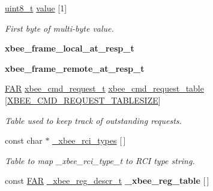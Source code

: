 \begin{DoxyCompactItemize}
\item 
\hyperlink{group__hal_gae1affc9ca37cfb624959c866a73f83c2}{uint8\-\_\-t} \hyperlink{group__xbee__atcmd_ga5bf2410fa8ec37f47f8afeba8dcc7f1b}{value} \mbox{[}1\mbox{]}
\begin{DoxyCompactList}\small\item\em First byte of multi-\/byte value. \end{DoxyCompactList}\item 
\hypertarget{group__xbee__atcmd_gab63b15c8139a653c95998e4c1bcd2b99}{{\bfseries xbee\-\_\-frame\-\_\-local\-\_\-at\-\_\-resp\-\_\-t}}\label{group__xbee__atcmd_gab63b15c8139a653c95998e4c1bcd2b99}

\item 
\hypertarget{group__xbee__atcmd_ga4c2b2ae22bdb77d9f8427b9bfff5a35d}{{\bfseries xbee\-\_\-frame\-\_\-remote\-\_\-at\-\_\-resp\-\_\-t}}\label{group__xbee__atcmd_ga4c2b2ae22bdb77d9f8427b9bfff5a35d}

\item 
\hypertarget{group__xbee__atcmd_ga551531248de3d539dfb15bd89cf4734b}{\hyperlink{group__hal_gaef060b3456fdcc093a7210a762d5f2ed}{F\-A\-R} \hyperlink{structxbee__cmd__request__t}{xbee\-\_\-cmd\-\_\-request\-\_\-t} \hyperlink{group__xbee__atcmd_ga551531248de3d539dfb15bd89cf4734b}{xbee\-\_\-cmd\-\_\-request\-\_\-table} \mbox{[}\hyperlink{group__xbee__atcmd_gaf992e9b985e2b1eb185ef3d2d38a01c0}{X\-B\-E\-E\-\_\-\-C\-M\-D\-\_\-\-R\-E\-Q\-U\-E\-S\-T\-\_\-\-T\-A\-B\-L\-E\-S\-I\-Z\-E}\mbox{]}}\label{group__xbee__atcmd_ga551531248de3d539dfb15bd89cf4734b}

\begin{DoxyCompactList}\small\item\em Table used to keep track of outstanding requests. \end{DoxyCompactList}\item 
\hypertarget{group__xbee__atcmd_ga62238d483c628f8c996664ff0f47ccef}{const char $\ast$ \hyperlink{group__xbee__atcmd_ga62238d483c628f8c996664ff0f47ccef}{\-\_\-xbee\-\_\-rci\-\_\-types} \mbox{[}$\,$\mbox{]}}\label{group__xbee__atcmd_ga62238d483c628f8c996664ff0f47ccef}

\begin{DoxyCompactList}\small\item\em Table to map \-\_\-xbee\-\_\-rci\-\_\-type\-\_\-t to R\-C\-I type string. \end{DoxyCompactList}\item 
\hypertarget{group__xbee__atcmd_ga38e53826af221faaa9c92525dfeb8ed3}{const \hyperlink{group__hal_gaef060b3456fdcc093a7210a762d5f2ed}{F\-A\-R} \hyperlink{struct__xbee__reg__descr__t}{\-\_\-xbee\-\_\-reg\-\_\-descr\-\_\-t} {\bfseries \-\_\-xbee\-\_\-reg\-\_\-table} \mbox{[}$\,$\mbox{]}}\label{group__xbee__atcmd_ga38e53826af221faaa9c92525dfeb8ed3}

\end{DoxyCompactItemize}
